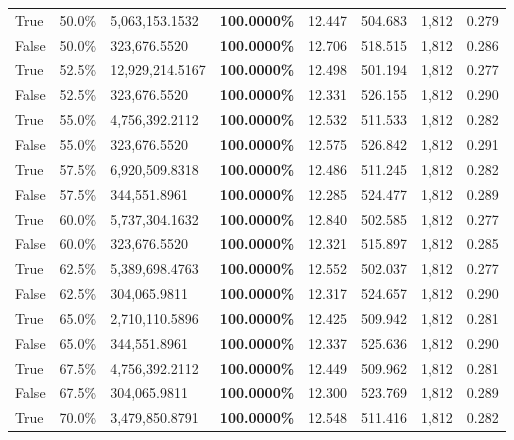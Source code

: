 \begin{table}[H]
\begin{tabular}{lllrllll}
\cline{1-8}
True & 50.0\% & 5,063,153.1532 & \bfseries \color{red} 100.0000\% & 12.447 & 504.683 & 1,812 & 0.279 \\
\cline{1-8}
False & 50.0\% & 323,676.5520 & \bfseries \color{red} 100.0000\% & 12.706 & 518.515 & 1,812 & 0.286 \\
\cline{1-8}
True & 52.5\% & 12,929,214.5167 & \bfseries \color{red} 100.0000\% & 12.498 & 501.194 & 1,812 & 0.277 \\
\cline{1-8}
False & 52.5\% & 323,676.5520 & \bfseries \color{red} 100.0000\% & 12.331 & 526.155 & 1,812 & 0.290 \\
\cline{1-8}
True & 55.0\% & 4,756,392.2112 & \bfseries \color{red} 100.0000\% & 12.532 & 511.533 & 1,812 & 0.282 \\
\cline{1-8}
False & 55.0\% & 323,676.5520 & \bfseries \color{red} 100.0000\% & 12.575 & 526.842 & 1,812 & 0.291 \\
\cline{1-8}
True & 57.5\% & 6,920,509.8318 & \bfseries \color{red} 100.0000\% & 12.486 & 511.245 & 1,812 & 0.282 \\
\cline{1-8}
False & 57.5\% & 344,551.8961 & \bfseries \color{red} 100.0000\% & 12.285 & 524.477 & 1,812 & 0.289 \\
\cline{1-8}
True & 60.0\% & 5,737,304.1632 & \bfseries \color{red} 100.0000\% & 12.840 & 502.585 & 1,812 & 0.277 \\
\cline{1-8}
False & 60.0\% & 323,676.5520 & \bfseries \color{red} 100.0000\% & 12.321 & 515.897 & 1,812 & 0.285 \\
\cline{1-8}
True & 62.5\% & 5,389,698.4763 & \bfseries \color{red} 100.0000\% & 12.552 & 502.037 & 1,812 & 0.277 \\
\cline{1-8}
False & 62.5\% & \color{red} 304,065.9811 & \bfseries \color{red} 100.0000\% & 12.317 & 524.657 & 1,812 & 0.290 \\
\cline{1-8}
True & 65.0\% & 2,710,110.5896 & \bfseries \color{red} 100.0000\% & 12.425 & 509.942 & 1,812 & 0.281 \\
\cline{1-8}
False & 65.0\% & 344,551.8961 & \bfseries \color{red} 100.0000\% & 12.337 & 525.636 & 1,812 & 0.290 \\
\cline{1-8}
True & 67.5\% & 4,756,392.2112 & \bfseries \color{red} 100.0000\% & 12.449 & 509.962 & 1,812 & 0.281 \\
\cline{1-8}
False & 67.5\% & \color{red} 304,065.9811 & \bfseries \color{red} 100.0000\% & 12.300 & 523.769 & 1,812 & 0.289 \\
\cline{1-8}
True & 70.0\% & 3,479,850.8791 & \bfseries \color{red} 100.0000\% & 12.548 & 511.416 & 1,812 & 0.282 \\

\end{tabular}
\end{table}
